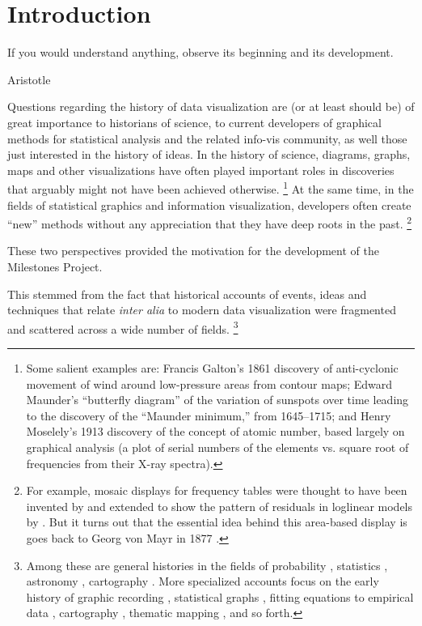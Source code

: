 \section{Introduction}\label{sec:intro}
\epigraph{If you would understand anything, observe its beginning and its development.}{Aristotle}

Questions regarding the history of data visualization are (or at least should be) of great importance to historians of science, to current developers of graphical methods for statistical analysis and the related info-vis community, as well those just interested in the history of ideas. In the history of science, diagrams, graphs, maps and other visualizations have often played important roles in discoveries that arguably might not have been achieved otherwise.%
\footnote{
	Some salient examples are:
	Francis Galton's 1861 discovery of anti-cyclonic movement of wind around low-pressure areas from contour maps; Edward Maunder's ``butterfly diagram'' of the variation of sunspots over time leading to the	discovery of the ``Maunder minimum,'' from 1645--1715; and Henry Moselely's 1913 discovery of the concept of atomic number, based largely on graphical analysis (a plot of serial numbers of the elements vs. square root of frequencies from their X-ray spectra).
}
At the same time, in the fields of statistical graphics and information visualization, developers often create ``new'' methods without any appreciation that they have deep roots in the past.%
\footnote{
  For example, mosaic displays for frequency tables were thought to have been invented by \citet{HartiganKleiner:81} and extended to show the pattern of residuals in loglinear models by \citet{Friendly:94a}. But it turns out that the essential idea behind this area-based display is goes back to Georg von Mayr in 1877 \citep{Friendly:2002:mosahist}.
}

These two perspectives provided the motivation for the development of the Milestones Project. 

This stemmed from the fact that historical accounts of events, ideas and techniques that relate \emph{inter alia} to modern data visualization were fragmented and scattered across a wide number of fields.%
\footnote{
Among these are general histories in the fields of probability \citep{Hald:1990}, statistics \citep{Pearson:1978,Porter:1986,Stigler:1986}, astronomy \citep{Riddell:1980}, cartography \citep{WallisRobinson:87}. More specialized accounts focus on the early history of graphic recording \citep{HoffGeddes:1959,HoffGeddes:1962}, statistical graphs \citep{Funkhouser:1936,Funkhouser:1937,Royston:1970,Tilling:1975}, fitting equations to empirical data \citep{Farebrother:1999}, cartography \citep{Friis:1974,Kruskal:1977}, thematic mapping \citep{FriendlyPalsky:2007,Palsky:1996,Robinson:1982}, and so forth.
}

